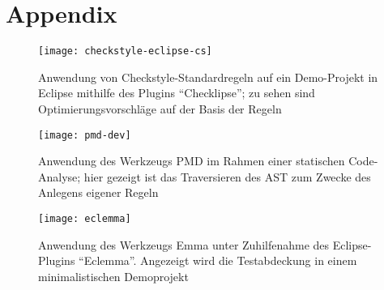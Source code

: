 
\section{Appendix}

\begin{figure}[h!]
\centering
\texttt{[image: checkstyle-eclipse-cs]}
\caption{Anwendung von Checkstyle-Standardregeln auf ein Demo-Projekt in Eclipse mithilfe des Plugins ``Checklipse''; zu sehen sind Optimierungsvorschläge auf der Basis der Regeln}
\label{fig:eclipse-cs}
\end{figure}

\newpage

\begin{figure}
\centering
\texttt{[image: pmd-dev]}
\caption{Anwendung des Werkzeugs PMD im Rahmen einer statischen Code-Analyse; hier gezeigt ist das Traversieren des AST zum Zwecke des Anlegens eigener Regeln}
\label{fig:pmd}
\end{figure}

\newpage

\begin{figure}
\centering
\texttt{[image: eclemma]}
\caption{Anwendung des Werkzeugs Emma unter Zuhilfenahme des Eclipse-Plugins ``Eclemma''. Angezeigt wird die Testabdeckung in einem minimalistischen Demoprojekt}
\label{fig:eclemma}
\end{figure}